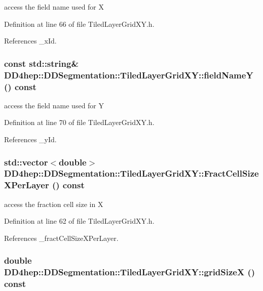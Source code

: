 access the field name used for X 

Definition at line 66 of file TiledLayerGridXY.h.

References \_\-xId.\hypertarget{class_d_d4hep_1_1_d_d_segmentation_1_1_tiled_layer_grid_x_y_ad401dafbadacc2036d67181928682742}{
\subsubsection[{fieldNameY}]{\setlength{\rightskip}{0pt plus 5cm}const std::string\& DD4hep::DDSegmentation::TiledLayerGridXY::fieldNameY () const}}
\label{class_d_d4hep_1_1_d_d_segmentation_1_1_tiled_layer_grid_x_y_ad401dafbadacc2036d67181928682742}


access the field name used for Y 

Definition at line 70 of file TiledLayerGridXY.h.

References \_\-yId.\hypertarget{class_d_d4hep_1_1_d_d_segmentation_1_1_tiled_layer_grid_x_y_a328d361bb8b6d45143b940539dbb089e}{
\subsubsection[{FractCellSizeXPerLayer}]{\setlength{\rightskip}{0pt plus 5cm}std::vector$<$double$>$ DD4hep::DDSegmentation::TiledLayerGridXY::FractCellSizeXPerLayer () const}}
\label{class_d_d4hep_1_1_d_d_segmentation_1_1_tiled_layer_grid_x_y_a328d361bb8b6d45143b940539dbb089e}


access the fraction cell size in X 

Definition at line 62 of file TiledLayerGridXY.h.

References \_\-fractCellSizeXPerLayer.\hypertarget{class_d_d4hep_1_1_d_d_segmentation_1_1_tiled_layer_grid_x_y_a87648f3136523b1d32b0c3a02e85fa28}{
\subsubsection[{gridSizeX}]{\setlength{\rightskip}{0pt plus 5cm}double DD4hep::DDSegmentation::TiledLayerGridXY::gridSizeX () const}}
\label{class_d_d4hep_1_1_d_d_segmentation_1_1_tiled_layer_grid_x_y_a87648f3136523b1d32b0c3a02e85fa28}


